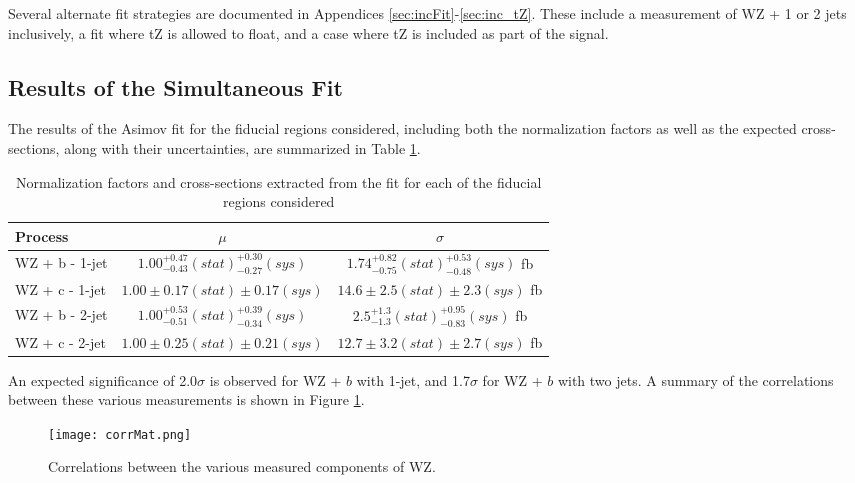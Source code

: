 Several alternate fit strategies are documented in Appendices \ref{sec:incFit}-\ref{sec:inc_tZ}. These include a measurement of WZ + 1 or 2 jets inclusively, a fit where tZ is allowed to float, and a case where tZ is included as part of the signal.

\subsection{Results of the Simultaneous Fit}
\label{sec:resSum}

The results of the Asimov fit for the fiducial regions considered, including both the normalization factors as well as the expected cross-sections, along with their uncertainties, are summarized in Table \ref{tab:WZ_results}.

\hspace{-1in}\begin{table}[H]
\begin{adjustwidth}{-3em}{-3em}
\begin{center}
\begin{tabular}{|l|c|c|}
\hline\hline
Process & $\mu$ & $\sigma$ \\
\hline
WZ + b - 1-jet & $1.00^{+0.47}_{-0.43}(stat)^{+0.30}_{-0.27}(sys)$ & $1.74^{+0.82}_{-0.75}(stat)^{+0.53}_{-0.48}(sys)$ fb \\
WZ + c - 1-jet & $1.00 \pm 0.17(stat) \pm 0.17(sys)$ & $14.6 \pm 2.5 (stat) \pm 2.3 (sys)$ fb \\
WZ + b - 2-jet & $1.00^{+0.53}_{-0.51}(stat)^{+0.39}_{-0.34}(sys)$ & $2.5^{+1.3}_{-1.3}(stat)^{+0.95}_{-0.83}(sys)$ fb \\
WZ + c - 2-jet & $1.00 \pm 0.25(stat) \pm 0.21(sys)$ & $12.7 \pm 3.2 (stat) \pm 2.7 (sys)$ fb \\
\hline
\end{tabular}
\caption{Normalization factors and cross-sections extracted from the fit for each of the fiducial regions considered}
\label{tab:WZ_results}
\end{center}
\end{adjustwidth}
\end{table}

An expected significance of 2.0$\sigma$ is observed for WZ + $b$ with 1-jet, and 1.7$\sigma$ for WZ + $b$ with two jets. A summary of the correlations between these various measurements is shown in Figure \ref{fig:corrMat}.

\begin{figure}[H]
  \center
  \texttt{[image: corrMat.png]}
  \caption{Correlations between the various measured components of WZ.}
  \label{fig:corrMat}
\end{figure}


